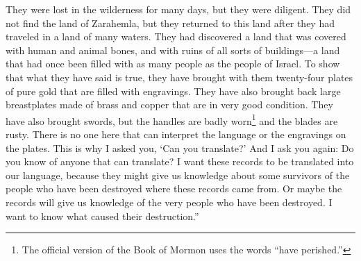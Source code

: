 They were lost in the wilderness for many days, but they were diligent. They did not find the land of Zarahemla, but they returned to this land after they had traveled in a land of many waters. They had discovered a land that was covered with human and animal bones, and with ruins of all sorts of buildings---a land that had once been filled with as many people as the people of Israel.
\bverse \iffalse And for a testimony that the things that they had said are true they have brought twenty-four plates which are filled with engravings, and they are of pure gold. \fi
To show that what they have said is true, they have brought with them twenty-four plates of pure gold that are filled with engravings.
\bverse \iffalse And behold, also, they have brought breastplates, which are large, and they are of brass and of copper, and are perfectly sound. \fi
They have also brought back large breastplates made of brass and copper that are in very good condition.
\bverse \iffalse And again, they have brought swords, the hilts thereof have perished, and the blades thereof were cankered with rust; and there is no one in the land that is able to interpret the language or the engravings that are on the plates. Therefore I said unto thee: Canst thou translate? \fi
They have also brought swords, but the handles are badly worn\footnote{The official version of the Book of Mormon uses the words ``have perished.''} and the blades are rusty. There is no one here that can interpret the language or the engravings on the plates. This is why I asked you, \lq Can you translate?\rq
\bverse \iffalse And I say unto thee again: Knowest thou of any one that can translate? For I am desirous that these records should be translated into our language; for, perhaps, they will give us a knowledge of a remnant of the people who have been destroyed, from whence these records came; or, perhaps, they will give us a knowledge of this very people who have been destroyed; and I am desirous to know the cause of their destruction. \fi
And I ask you again: Do you know of anyone that can translate? I want these records to be translated into our language, because they might give us knowledge about some survivors of the people who have been destroyed where these records came from. Or maybe the records will give us knowledge of the very people who have been destroyed. I want to know what caused their destruction.''
\bverse \iffalse Now Ammon said unto him: I can assuredly tell thee, O king, of a man that can translate the records; for he has wherewith that he can look, and translate all records that are of ancient date; and it is a gift from God. And the things are called interpreters, and no man can look in them except he be commanded, lest he should look for that he ought not and he should perish.  And whosoever is commanded to look in them, the same is called seer. \fi
